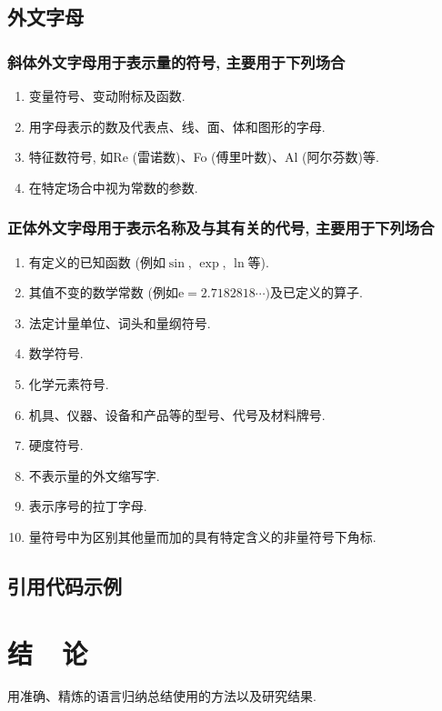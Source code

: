 \documentclass{urtemp}
\begin{document}
\subsection{外文字母}
\subsubsection{斜体外文字母用于表示量的符号, 主要用于下列场合}

\begin{enumerate}
\renewcommand{\labelenumi}{(\theenumi)}
\item 变量符号、变动附标及函数. 
\item 用字母表示的数及代表点、线、面、体和图形的字母. 
\item 特征数符号, 如Re (雷诺数)、Fo (傅里叶数)、Al (阿尔芬数)等. 
\item 在特定场合中视为常数的参数. 
\end{enumerate} 

\subsubsection{正体外文字母用于表示名称及与其有关的代号, 主要用于下列场合}
\begin{enumerate}
\renewcommand{\labelenumi}{(\theenumi)}
\item 有定义的已知函数 (例如$\sin$, $\exp$, $\ln$等). 
\item 其值不变的数学常数 (例如$\mathrm{e} = 2.718 281 8\cdots)$及已定义的算子. 
\item 法定计量单位、词头和量纲符号. 
\item 数学符号. 
\item 化学元素符号. 
\item 机具、仪器、设备和产品等的型号、代号及材料牌号. 
\item 硬度符号. 
\item 不表示量的外文缩写字. 
\item 表示序号的拉丁字母. 
\item 量符号中为区别其他量而加的具有特定含义的非量符号下角标. 
\end{enumerate} 

\subsection{引用代码示例}



\section{结~~论}
用准确、精炼的语言归纳总结使用的方法以及研究结果. 
\end{document}
